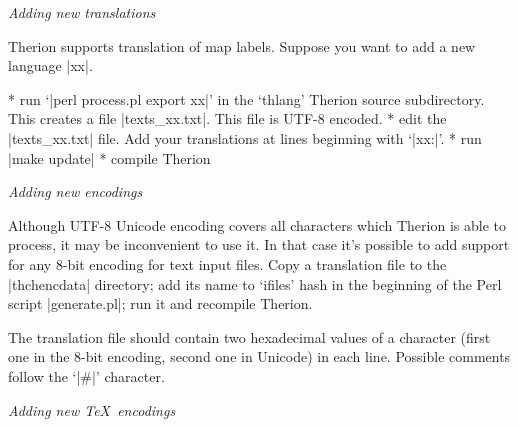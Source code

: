 {\it Adding new translations}

Therion supports translation of map labels.
Suppose you want to add a new language |xx|.

\list
* run `|perl process.pl export xx|' in the `thlang' Therion source subdirectory.
  This creates a file |texts_xx.txt|. This file is UTF-8 encoded.
* edit the |texts_xx.txt| file. Add your translations at lines beginning with
  `|xx:|'.
* run |make update|
* compile Therion
\endlist


{\it Adding new encodings}

Although UTF-8 Unicode encoding covers all characters which Therion is able to
process, it may be inconvenient to use it. In that case it's possible to add
support for any 8-bit encoding for text input files. Copy a translation file to
the |thchencdata| directory; add its name to `ifiles' hash in the beginning of
the Perl script |generate.pl|; run it and recompile Therion.

The translation file should contain two hexadecimal values of a character
(first one in the 8-bit encoding, second one in Unicode) in each line. Possible
comments follow the `|#|' character.

{\it Adding new \TeX\ encodings}

